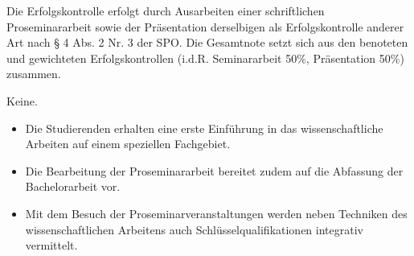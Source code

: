\begin{course}

\setdoclanguagegerman
{}



\coursehead


\label{cour_13895.dp_997}


\begin{styleenv}
\begin{assessment}
Die Erfolgskontrolle erfolgt durch Ausarbeiten einer schriftlichen Proseminararbeit sowie der Präsentation derselbigen als Erfolgskontrolle anderer Art nach § 4 Abs. 2 Nr. 3 der SPO. Die Gesamtnote setzt sich aus den benoteten und gewichteten Erfolgskontrollen (i.d.R. Seminararbeit 50\%, Präsentation 50\%) zusammen.


\end{assessment}

\begin{conditions}Keine.\end{conditions}


\end{styleenv}

\begin{learningoutcomes}
\begin{itemize}\item Die Studierenden erhalten eine erste Einführung in das wissenschaftliche Arbeiten auf einem speziellen Fachgebiet.  \item Die Bearbeitung der Proseminararbeit bereitet zudem auf die Abfassung der Bachelorarbeit vor.  \item  Mit dem Besuch der Proseminarveranstaltungen werden neben Techniken des wissenschaftlichen Arbeitens auch Schlüsselqualifikationen integrativ vermittelt.  \end{itemize}
\end{learningoutcomes}


\end{course}
